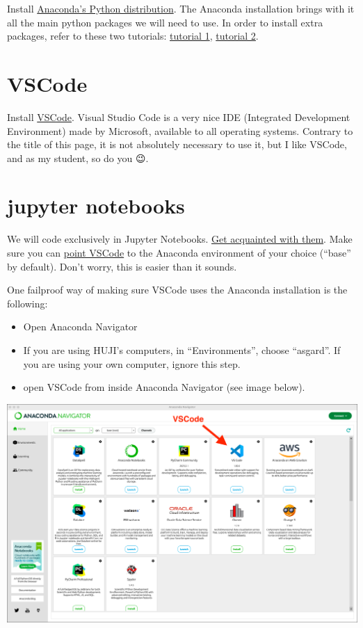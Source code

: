 \documentclass[
  letterpaper,
  DIV=11,
  numbers=noendperiod,
  oneside]{scrreprt}
\providecommand{\tightlist}{%
  \setlength{\itemsep}{0pt}\setlength{\parskip}{0pt}}\usepackage{longtable,booktabs,array}
\begin{document}
Install \href{https://www.anaconda.com/download}{Anaconda's Python
distribution}. The Anaconda installation brings with it all the main
python packages we will need to use. In order to install extra packages,
refer to these two tutorials:
\href{https://www.tutorialspoint.com/how-do-i-install-python-packages-in-anaconda}{tutorial
1},
\href{https://docs.anaconda.com/free/anaconda/packages/install-packages.html}{tutorial
2}.

\hypertarget{vscode}{%
\section{VSCode}\label{vscode}}

Install \href{https://code.visualstudio.com/download}{VSCode}. Visual
Studio Code is a very nice IDE (Integrated Development Environment) made
by Microsoft, available to all operating systems. Contrary to the title
of this page, it is not absolutely necessary to use it, but I like
VSCode, and as my student, so do you 😉.

\hypertarget{jupyter-notebooks}{%
\section{jupyter notebooks}\label{jupyter-notebooks}}

We will code exclusively in Jupyter Notebooks.
\href{https://code.visualstudio.com/docs/datascience/jupyter-notebooks}{Get
acquainted with them}. Make sure you can
\href{https://opensourceoptions.com/blog/setup-anaconda-python-to-work-with-visual-studio-code-on-windows/}{point
VSCode} to the Anaconda environment of your choice (``base'' by
default). Don't worry, this is easier than it sounds.

One failproof way of making sure VSCode uses the Anaconda installation
is the following:

\begin{itemize}
\tightlist
\item
  Open Anaconda Navigator
\item
  If you are using HUJI's computers, in ``Environments'', choose
  ``asgard''. If you are using your own computer, ignore this step.
\item
  open VSCode from inside Anaconda Navigator (see image below).
\end{itemize}

\includegraphics{basics/anaconda-navigator.png}
\end{document}
